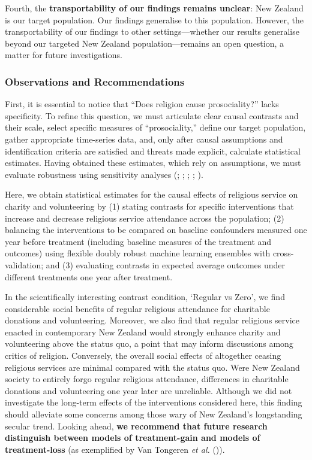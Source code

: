 \documentclass[
  single column]{article}
\begin{document}
Fourth, the \textbf{transportability of our findings remains unclear}:
New Zealand is our target population. Our findings generalise to this
population. However, the transportability of our findings to other
settings---whether our results generalise beyond our targeted New
Zealand population---remains an open question, a matter for future
investigations.

\subsubsection{Observations and
Recommendations}\label{observations-and-recommendations}

First, it is essential to notice that ``Does religion cause
prosociality?'' lacks specificity. To refine this question, we must
articulate clear causal contrasts and their scale, select specific
measures of ``prosociality,'' define our target population, gather
appropriate time-series data, and, only after causal assumptions and
identification criteria are satisfied and threats made explicit,
calculate statistical estimates. Having obtained these estimates, which
rely on assumptions, we must evaluate robustness using sensitivity
analyses (;
;
;
;
).

Here, we obtain statistical estimates for the causal effects of
religious service on charity and volunteering by (1) stating contrasts
for specific interventions that increase and decrease religious service
attendance across the population; (2) balancing the interventions to be
compared on baseline confounders measured one year before treatment
(including baseline measures of the treatment and outcomes) using
flexible doubly robust machine learning ensembles with cross-validation;
and (3) evaluating contrasts in expected average outcomes under
different treatments one year after treatment.

In the scientifically interesting contrast condition, `Regular vs Zero',
we find considerable social benefits of regular religious attendance for
charitable donations and volunteering. Moreover, we also find that
regular religious service enacted in contemporary New Zealand would
strongly enhance charity and volunteering above the status quo, a point
that may inform discussions among critics of religion. Conversely, the
overall social effects of altogether ceasing religious services are
minimal compared with the status quo. Were New Zealand society to
entirely forgo regular religious attendance, differences in charitable
donations and volunteering one year later are unreliable. Although we
did not investigate the long-term effects of the interventions
considered here, this finding should alleviate some concerns among those
wary of New Zealand's longstanding secular trend. Looking ahead,
\textbf{we recommend that future research distinguish between models of
treatment-gain and models of treatment-loss} (as exemplified by Van
Tongeren \emph{et al.} ()).
\end{document}
